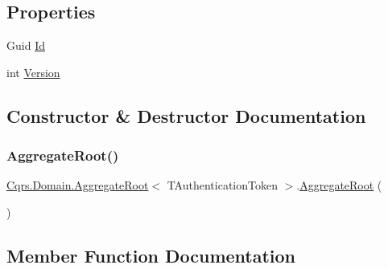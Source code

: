 \subsection*{Properties}
\begin{DoxyCompactItemize}
\item 
Guid \hyperlink{classCqrs_1_1Domain_1_1AggregateRoot_ab84d521c8c3bffd3c2e58959984d1e88}{Id}
\item 
int \hyperlink{classCqrs_1_1Domain_1_1AggregateRoot_a15f351663975c1d8e2cdc37b8c4d970f}{Version}
\end{DoxyCompactItemize}


\subsection{Constructor \& Destructor Documentation}
\mbox{\label{classCqrs_1_1Domain_1_1AggregateRoot_a1db2322dd7442e1e0c3c07332124eb2f}} 
\subsubsection{\texorpdfstring{Aggregate\+Root()}{AggregateRoot()}}
{\footnotesize\ttfamily \hyperlink{classCqrs_1_1Domain_1_1AggregateRoot}{Cqrs.\+Domain.\+Aggregate\+Root}$<$ T\+Authentication\+Token $>$.\hyperlink{classCqrs_1_1Domain_1_1AggregateRoot}{Aggregate\+Root} (\begin{DoxyParamCaption}{ }\end{DoxyParamCaption})\hspace{0.3cm}{\ttfamily [protected]}}



\subsection{Member Function Documentation}
\mbox{\label{classCqrs_1_1Domain_1_1AggregateRoot_a7e299b13c7556731e52670aa6d782296}} 
